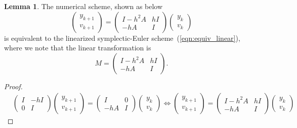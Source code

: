 \documentclass[11pt,fceqn]{article}
\numberwithin{equation}{section}
\theoremstyle{definition}
\newtheorem{lem}[thm]{Lemma}
\begin{document}
\begin{lem}
\label{lem:equiv} The numerical scheme, shown as below
\begin{equation}
\label{eqn:equiv}
\begin{pmatrix}
       y_{k+1} \\
       v_{k+1}  
\end{pmatrix} = \begin{pmatrix}
       I -h^{2}A & hI \\
       -hA       & I 
\end{pmatrix}\begin{pmatrix}
       y_{k} \\
       v_{k}  
\end{pmatrix}
\end{equation}
is equivalent to the linearized symplectic-Euler scheme~(\ref{eqn:equiv_linear}), where we note that the linear transformation is 
\begin{equation}
\label{eqn:equivmatrix}
M
=\begin{pmatrix}
       I -h^{2}A & hI \\
       -hA       & I 
\end{pmatrix}.
\end{equation}
\end{lem}
\begin{proof}
$$
\begin{aligned}
&\begin{pmatrix}
I & -hI \\
0 &   I
\end{pmatrix}\begin{pmatrix}
       y_{k+1} \\
       v_{k+1}  
\end{pmatrix} = \begin{pmatrix}
I   &   0 \\
-hA &   I
\end{pmatrix}\begin{pmatrix}
       y_{k} \\
       v_{k}  
\end{pmatrix}
\Leftrightarrow \begin{pmatrix}
       y_{k+1} \\
       v_{k+1}  
\end{pmatrix} = \begin{pmatrix}
I-h^{2}A   &   hI \\
-hA &   I
\end{pmatrix}\begin{pmatrix}
       y_{k} \\
       v_{k}  
\end{pmatrix}
 \end{aligned}
$$
\end{proof}
\end{document}
